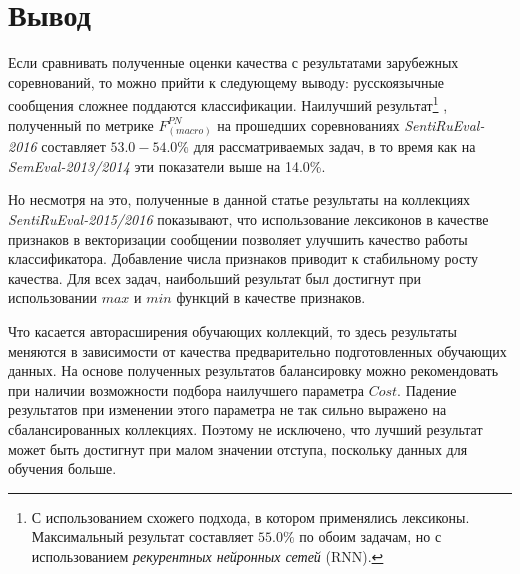 \section*{Вывод}
Если сравнивать полученные оценки качества с результатами зарубежных
соревнований, то можно прийти к следующему выводу: русскоязычные сообщения
сложнее поддаются классификации.
Наилучший результат\footnote{
    С использованием схожего подхода, в котором применялись лексиконы.
    Максимальный результат составляет $55.0\%$ по обоим задачам, но с
    использованием {\it рекурентных нейронных сетей} (RNN).
}
, полученный по метрике $F_{(macro)}^{PN}$ на
прошедших соревнованиях {\it SentiRuEval-2016} составляет $53.0-54.0\%$
для рассматриваемых задач, в то время как на {\it SemEval-2013/2014} эти
показатели выше на 14.0\%.

Но несмотря на это, полученные в данной статье результаты на коллекциях {\it SentiRuEval-2015/2016}
показывают, что использование лексиконов в качестве признаков в векторизации
сообщении позволяет улучшить качество работы классификатора.
Добавление числа признаков приводит к стабильному росту качества.
Для всех задач, наибольший результат был достигнут при использовании $max$ и $min$ функций
в качестве признаков.

Что касается авторасширения обучающих коллекций, то здесь результаты меняются
в зависимости от качества предварительно подготовленных обучающих данных.
На основе полученных результатов балансировку можно рекомендовать при наличии
возможности подбора наилучшего параметра $Cost$.
Падение результатов при изменении этого параметра не так сильно
выражено на сбалансированных коллекциях.
Поэтому не исключено, что лучший результат может быть достигнут при малом
значении отступа, поскольку данных для обучения больше.
